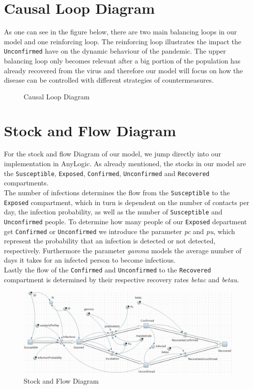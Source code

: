\documentclass
[
    report,
    11pt,
    bibliography = totoc,
    listof = totoc,
    headinclude = true,
]
{scrreport}
\begin{document}
\section{Causal Loop Diagram}

As one can see in the figure below, there are two main balancing loops
in our model and one reinforcing loop. The reinforcing loop illustrates the impact the \texttt{Unconfirmed} have on the dynamic behaviour of the pandemic. The upper balancing loop only
becomes relevant after a big portion of the population has already recovered
from the virus and therefore our model will focus on how the disease can
be controlled with different strategies of countermeasures.

\begin{figure}[hbt!]
  
  \caption{Causal Loop Diagram}
\end{figure}

\section{Stock and Flow Diagram}

For the stock and flow Diagram of our model, we jump directly into
our implementation in AnyLogic. As already mentioned, the stocks in our model
are the \texttt{Susceptible}, \texttt{Exposed}, \texttt{Confirmed}, \texttt{Unconfirmed} and \texttt{Recovered} compartments. \\
The number of infections determines the flow from the \texttt{Susceptible} to the
\texttt{Exposed} compartment, which in turn is dependent on the number of contacts
per day, the infection probability, as well as the number of \texttt{Susceptible}
and \texttt{Unconfirmed} people. To determine how many people of our \texttt{Exposed}
department get \texttt{Confirmed} or \texttt{Unconfirmed} we introduce the parameter
\textit{pc} and \textit{pu}, which represent the probability that an infection
is detected or not detected, respectively. Furthermore the parameter \textit{gamma}
models the average number of days it takes for an infected person to become infectious. \\
Lastly the flow of the \texttt{Confirmed} and \texttt{Unconfirmed} to the \texttt{Recovered}
compartment is determined by their respective recovery rates \textit{betac} and \textit{betau}.

\begin{figure}[hbt!]
  \includegraphics[width=\linewidth]{../AnyLogicSIR.JPG}
  \caption{Stock and Flow Diagram}
\end{figure}
\end{document}
